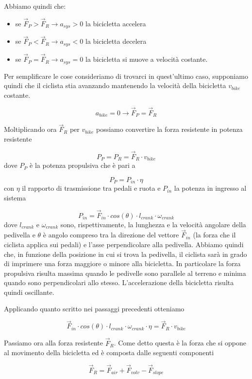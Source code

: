 \documentclass[class=article]{standalone}
\begin{document}
	Abbiamo quindi che:
	\begin{itemize}
		\item se \(\vec{F}_{P}>\vec{F}_{R} \rightarrow a_{sys}>0\) la bicicletta accelera
		\item se \(\vec{F}_{P}<\vec{F}_{R} \rightarrow a_{sys}<0\) la bicicletta decelera
		\item se \(\vec{F}_{P}=\vec{F}_{R} \rightarrow a_{sys}=0\) la bicicletta si muove a velocità costante.
	\end{itemize}
	
	Per semplificare le cose consideriamo di trovarci in quest'ultimo caso, supponiamo quindi che il ciclista stia avanzando mantenendo la velocità della bicicletta \(v_{bike}\) costante.
		
	\[a_{bike}=0 \rightarrow \vec{F}_{P}=\vec{F}_{R}\]
	
	Moltiplicando ora \(\vec{F}_{R}\) per \(v_{bike}\) possiamo convertire la forza resistente in potenza resistente
	
	\[P_{P}=P_{R}=\vec{F}_{R}\cdot v_{bike}\]
	dove \(P_{P}\) è la potenza propulsiva che è pari a
	
	\[P_{P}=P_{in}\cdot\eta\]
	con \(\eta\) il rapporto di trasmissione tra pedali e ruota e \(P_{in}\) la potenza in ingresso al sistema
	
	\[P_{in}=\vec{F}_{in}\cdot cos(\theta)\cdot l_{crank}\cdot\omega_{crank}\]
	dove \(l_{crank}\) e \(\omega_{crank}\) sono, rispettivamente, la lunghezza e la velocità angolare della pedivella e \(\theta\) è angolo compreso tra la direzione del vettore \(\vec{F}_{in}\) (la forza che il ciclista applica sui pedali) e l'asse perpendicolare alla pedivella. Abbiamo quindi che, in funzione della posizione in cui si trova la pedivella, il ciclista sarà in grado di imprimere una forza maggiore o minore alla bicicletta. In particolare la forza propulsiva risulta massima quando le pedivelle sono parallele al terreno e minima quando sono perpendicolari allo stesso. L'accelerazione della bicicletta risulta quindi oscillante.
	
	Applicando quanto scritto nei passaggi precedenti otteniamo
	
	\[\vec{F}_{in}\cdot cos(\theta)\cdot l_{crank}\cdot \omega_{crank}\cdot\eta=\vec{F}_{R}\cdot v_{bike}\]
	
	Passiamo ora alla forza resistente \(\vec{F}_{R}\). Come detto questa è la forza che si oppone al movimento della bicicletta ed è composta dalle seguenti componenti
	
	\[\vec{F}_{R}=\vec{F}_{air}+\vec{F}_{volv}-\vec{F}_{slope}\]
	
\end{document}
